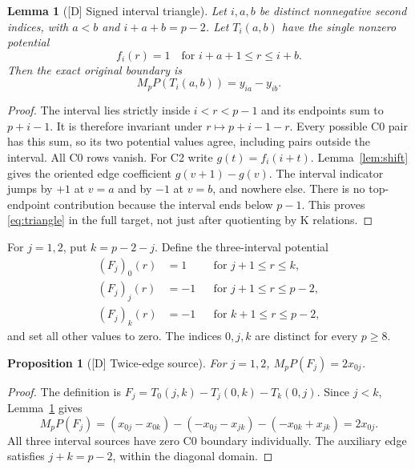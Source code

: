\documentclass[11pt]{article}
\newtheorem{proposition}[theorem]{Proposition}
\newtheorem{lemma}[theorem]{Lemma}
\theoremstyle{definition}
\theoremstyle{remark}
\begin{document}
\begin{lemma}[{[D]} Signed interval triangle]\label{lem:triangle}
Let $i,a,b$ be distinct nonnegative second indices, with $a<b$ and
$i+a+b=p-2$. Let $T_i(a,b)$ have the single nonzero potential
\[
 f_i(r)=1\quad\text{for }i+a+1\leq r\leq i+b.
\]
Then the exact original boundary is
\begin{equation}\label{eq:triangle}
 M_pP(T_i(a,b))=y_{ia}-y_{ib}.
\end{equation}
\end{lemma}
\begin{proof}
The interval lies strictly inside $i<r<p-1$ and its endpoints sum to
$p+i-1$. It is therefore invariant under $r\mapsto p+i-1-r$.
Every possible C0 pair has this sum, so its two potential values agree,
including pairs outside the interval. All C0 rows vanish.
For C2 write $g(t)=f_i(i+t)$. Lemma~\ref{lem:shift} gives the
oriented edge coefficient $g(v+1)-g(v)$. The interval indicator jumps
by $+1$ at $v=a$ and by $-1$ at $v=b$, and nowhere else.
There is no top-endpoint contribution because the interval ends below
$p-1$. This proves \eqref{eq:triangle} in the full target, not just
after quotienting by K relations.
\end{proof}

For $j=1,2$, put $k=p-2-j$. Define the three-interval potential
\begin{equation}\label{eq:Fj}
 \begin{aligned}
 (F_j)_0(r)&=1&&\text{for }j+1\leq r\leq k,\\
 (F_j)_j(r)&=-1&&\text{for }j+1\leq r\leq p-2,\\
 (F_j)_k(r)&=-1&&\text{for }k+1\leq r\leq p-2,
 \end{aligned}
\end{equation}
and set all other values to zero. The indices $0,j,k$ are distinct
for every $p\geq8$.

\begin{proposition}[{[D]} Twice-edge source]\label{prop:twiceedge}
For $j=1,2$, $M_pP(F_j)=2x_{0j}$.
\end{proposition}
\begin{proof}
The definition is $F_j=T_0(j,k)-T_j(0,k)-T_k(0,j)$. Since $j<k$,
Lemma~\ref{lem:triangle} gives
\[
 M_pP(F_j)=(x_{0j}-x_{0k})-(-x_{0j}-x_{jk})-(-x_{0k}+x_{jk})
          =2x_{0j}.
\]
All three interval sources have zero C0 boundary individually.
The auxiliary edge satisfies $j+k=p-2$, within the diagonal domain.
\end{proof}
\end{document}
